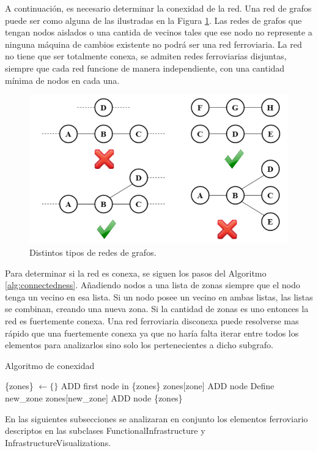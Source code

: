     A continuación, es necesario determinar la conexidad de la red. Una red de grafos puede ser como alguna de las ilustradas en la Figura \ref{fig:conexidad}. Las redes de grafos que tengan nodos aislados o una cantida de vecinos tales que ese nodo no represente a ninguna máquina de cambios existente no podrá ser una red ferroviaria. La red no tiene que ser totalmente conexa, se admiten redes ferroviarias disjuntas, siempre que cada red funcione de manera independiente, con una cantidad mínima de nodos en cada una.   

    \begin{figure}[!h]
        \centering
        \includegraphics[width=1\textwidth]{Figuras/conexo.PNG}
        \centering\caption{Distintos tipos de redes de grafos.}
        \label{fig:conexidad}
    \end{figure}

    Para determinar si la red es conexa, se siguen los pasos del Algoritmo \ref{alg:connectedness}. Añadiendo nodos a una lista de zonas siempre que el nodo tenga un vecino en esa lista. Si un nodo posee un vecino en ambas listas, las listas se combinan, creando una nueva zona. Si la cantidad de zonas es uno entonces la red es fuertemente conexa. Una red ferroviaria disconexa puede resolverse mas rápido que una fuertemente conexa ya que no haría falta iterar entre todos los elementos para analizarlos sino solo los pertenecientes a dicho subgrafo.
        
    \begin{algorithm}
        \label{alg:connectedness}
        \caption{Algoritmo de conexidad}
        \begin{algorithmic}
            \STATE \{zones\} $\gets \{ \}$
            \STATE ADD first node in \{zones\}
                            \STATE zones[zone] ADD node
                        \ELSE
                            \STATE Define new\_zone
                            \STATE zones[new\_zone] ADD node
                        \ENDIF
                    \ENDIF
                \ENDFOR
            \ENDFOR 
            \OUTPUT \{zones\}   
        \end{algorithmic}
    \end{algorithm}
        
    En las siguientes subsecciones se analizaran en conjunto los elementos ferroviario descriptos en las subclases FunctionalInfrastructure y InfrastructureVisualizations.